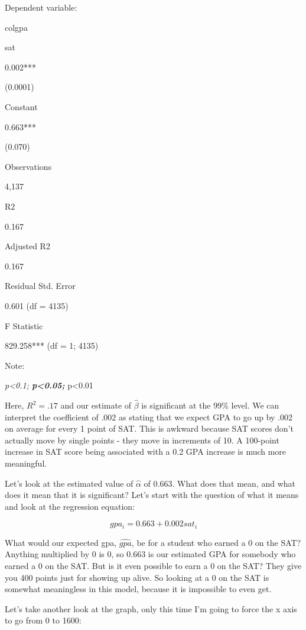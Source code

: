\documentclass[
  letterpaper,
]{book}
\begin{document}
Dependent variable:

colgpa

sat

0.002***

(0.0001)

Constant

0.663***

(0.070)

Observations

4,137

R2

0.167

Adjusted R2

0.167

Residual Std. Error

0.601 (df = 4135)

F Statistic

829.258*** (df = 1; 4135)

Note:

\emph{p\textless0.1; \textbf{p\textless0.05; }}p\textless0.01

Here, \(R^2 = .17\) and our estimate of \(\hat{\beta}\) is significant
at the 99\% level. We can interpret the coefficient of .002 as stating
that we expect GPA to go up by .002 on average for every 1 point of SAT.
This is awkward because SAT scores don't actually move by single points
- they move in increments of 10. A 100-point increase in SAT score being
associated with a 0.2 GPA increase is much more meaningful.

Let's look at the estimated value of \(\hat{\alpha}\) of 0.663. What
does that mean, and what does it mean that it is significant? Let's
start with the question of what it means and look at the regression
equation:

\begin{equation}
gpa_{i} = 0.663 + 0.002 sat_{i} 
\end{equation}

What would our expected gpa, \(\hat{gpa}\), be for a student who earned
a 0 on the SAT? Anything multiplied by 0 is 0, so 0.663 is our estimated
GPA for somebody who earned a 0 on the SAT. But is it even possible to
earn a 0 on the SAT? They give you 400 points just for showing up alive.
So looking at a 0 on the SAT is somewhat meaningless in this model,
because it is impossible to even get.

Let's take another look at the graph, only this time I'm going to force
the x axis to go from 0 to 1600:
\end{document}
